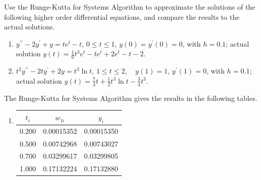 \begin{myexercise}%
Use the Runge-Kutta for Systems Algorithm to approximate the solutions of the following higher order differential equations, and compare the results to the actual solutions.
\begin{enumerate}[label=(\alph*)]
\item $y^{\prime \prime}-2 y^{\prime}+y=t e^{t}-t$, $0 \leq t \leq 1$, $y(0)=y^{\prime}(0)=0$, with $h=0.1$;
actual solution $y(t)=\frac{1}{6} t^{3} e^{t}-t e^{t}+2 e^{t}-t-2$.\\
\item $t^{2} y^{\prime \prime}-2 t y^{\prime}+2 y=t^{3} \ln t$, $1 \leq t \leq 2, \quad y(1)=1$, $y^{\prime}(1)=0$, with $h=0.1$; actual solution $y(t)=\frac{7}{4} t+\frac{1}{2} t^{3} \ln t-\frac{3}{4} t^{3}$.
\end{enumerate}

\begin{mysolution}
The Runge-Kutta for Systems Algorithm gives the results in the following tables.\\
\begin{enumerate}[label=(\alph*).]
\item

\begin{center}
\begin{tabular}{ccc}
\hline
$t_{i}$ & $w_{1 i}$ & $y_{i}$ \\
\hline
0.200 & 0.00015352 & 0.00015350 \\
0.500 & 0.00742968 & 0.00743027 \\
0.700 & 0.03299617 & 0.03299805 \\
1.000 & 0.17132224 & 0.17132880 \\
\hline
\end{tabular}
\end{center}


\end{enumerate}
\end{mysolution}
\end{myexercise}
